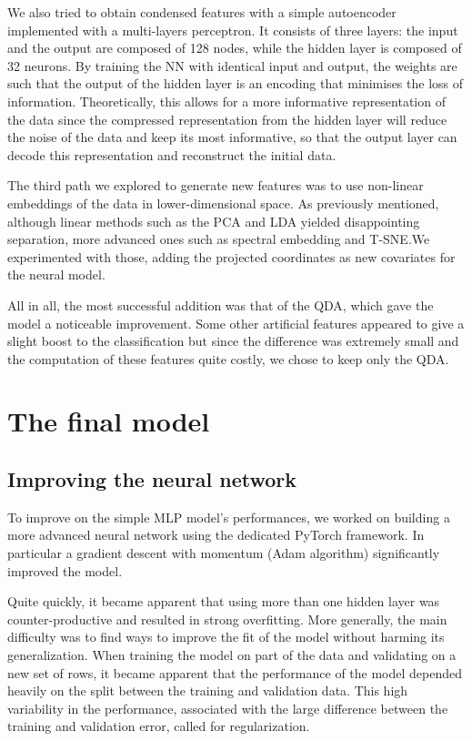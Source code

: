 \documentclass[a4paper,11pt,openany,extrafontsizes,oneside,article,twocolumn]{memoir}
\begin{document}
We also tried to obtain condensed features with a simple autoencoder
implemented with a multi-layers perceptron. It consists of three
layers: the input and the output are composed of 128 nodes, while the
hidden layer is composed of 32 neurons. By training the NN with
identical input and output, the weights are such that the output of
the hidden layer is an encoding that minimises the loss of
information. Theoretically, this allows for a more informative
representation of the data since the compressed representation from
the hidden layer will reduce the noise of the data and keep its most
informative, so that the output layer can decode this representation
and reconstruct the initial data.

The third path we explored to generate new features was to use
non-linear embeddings of the data in lower-dimensional space. As
previously mentioned, although linear methods such as the PCA and LDA
yielded disappointing separation, more advanced ones such as spectral
embedding and T-SNE.\@ We experimented with those, adding the
projected coordinates as new covariates for the neural model.

All in all, the most successful addition was that of the QDA, which
gave the model a noticeable improvement. Some other artificial
features appeared to give a slight boost to the classification but
since the difference was extremely small and the computation of these
features quite costly, we chose to keep only the QDA.\@


\chapter{The final model}

\section{Improving the neural network}

To improve on the simple MLP model's performances, we worked on
building a more advanced neural network using the dedicated PyTorch
framework. In particular a gradient descent with momentum (Adam
algorithm) significantly improved the model.

Quite quickly, it became apparent that using more than one hidden
layer was counter-productive and resulted in strong overfitting. More
generally, the main difficulty was to find ways to improve the fit of
the model without harming its generalization. When training the model
on part of the data and validating on a new set of rows, it became
apparent that the performance of the model depended heavily on the
split between the training and validation data. This high variability
in the performance, associated with the large difference between the
training and validation error, called for regularization.
\end{document}
